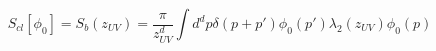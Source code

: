 \begin{equation}
S_{cl}[\phi_0]=S_b(z_{UV})= \frac {\pi} {z_{UV}^{d}} \int d^dp
\delta(p+p') \phi_0(p') \lambda_2(z_{UV}) \phi_0(p)
\label{scl2}
\end{equation}

